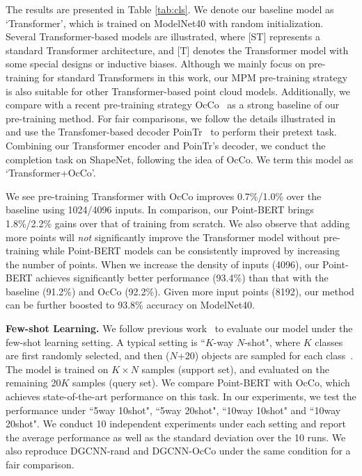 \documentclass[10pt,twocolumn,letterpaper]{article}
\newcommand{\paragrapha}[2][5pt]{\vspace{#1}\noindent\textbf{#2}}
\begin{document}
The results are presented in Table \ref{tab:cls}. We denote our baseline model as  `Transformer', which is trained on ModelNet40  with random initialization.  Several Transformer-based models are illustrated, where [ST] represents a standard Transformer architecture, and [T] denotes the Transformer model with some special designs or inductive biases. Although we mainly focus on pre-training for standard Transformers in this work, our MPM pre-training strategy is also suitable for other Transformer-based point cloud models\cite{guo2021pct,zhao2021point}. Additionally, we compare with a recent pre-training strategy OcCo~\cite{occo}  as a strong baseline of our pre-training method. For fair comparisons, we follow the details illustrated in~\cite{occo} and use the Transfomer-based decoder PoinTr~\cite{yu2021pointr} to perform their pretext task.  Combining our Transformer encoder and PoinTr's decoder, we conduct the completion task on ShapeNet, following the idea of OcCo.  We term this model as `Transformer+OcCo'. 

We see pre-training Transformer with OcCo improves 0.7\%/1.0\% over the baseline using 1024/4096 inputs. In comparison, our Point-BERT brings 1.8\%/2.2\% gains over that of training from scratch. We also observe that adding more points will \textit{not} significantly improve the Transformer model without pre-training while Point-BERT models can be consistently improved by increasing the number of points. When we increase the density of inputs (4096),  our Point-BERT achieves significantly better performance (93.4\%) than that with the baseline (91.2\%) and OcCo (92.2\%).  Given more input points (8192), our method can be further boosted to 93.8\% accuracy on ModelNet40. 
 


\paragrapha{Few-shot Learning.}
We follow previous work~\cite{sharma2020self} to evaluate our model under the few-shot learning setting. A typical setting is “$K$-way $N$-shot", where $K$ classes are first randomly selected, and then ($N$+20) objects are sampled for each class~\cite{sharma2020self}. The model is trained on $K\times N$ samples (support set), and evaluated on the remaining 20$K$ samples (query set). We compare Point-BERT with OcCo\cite{occo}, which achieves state-of-the-art performance on this task. In our experiments, we test the performance under ``5way 10shot", ``5way 20shot", ``10way 10shot" and ``10way 20shot". We conduct 10 independent experiments under each setting and report the average performance as well as the standard deviation over the 10 runs. We also reproduce DGCNN-rand and DGCNN-OcCo under the same condition for a fair comparison.
\end{document}
